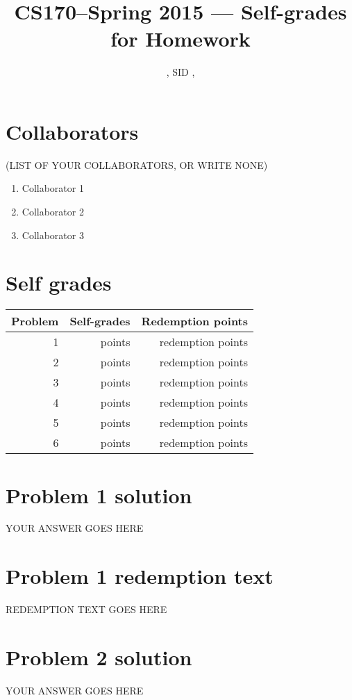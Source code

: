 \documentclass[11pt]{article}
\title{CS170--Spring 2015 --- Self-grades for Homework \Homework}
\author{\Name, SID \SID, \texttt{\Login}}
\date{}
\begin{document}
\maketitle

\section*{Collaborators} 
(LIST OF YOUR COLLABORATORS, OR WRITE NONE)

\begin{enumerate}
\item Collaborator 1
\item Collaborator 2
\item Collaborator 3
\end{enumerate}



\section*{Self grades}

\begin{table}[h]
\centering
\begin{tabular}{|r|r|r|}
\hline
 Problem & Self-grades & Redemption points     \\ \hline
1	&	 points	& 	redemption points     \\ \hline 
2	&	 points	& 	redemption points     \\ \hline 
3	&	 points	& 	redemption points     \\ \hline 
4	&	 points	& 	redemption points     \\ \hline 
5	&	 points	& 	redemption points     \\ \hline 
6	&	 points	& 	redemption points     \\ \hline 
\end{tabular}
\end{table}


\newpage
\section*{Problem 1 solution}
YOUR ANSWER GOES HERE

\newpage
\section*{Problem 1 redemption text}
REDEMPTION TEXT GOES HERE


\newpage
\section*{Problem 2 solution}
YOUR ANSWER GOES HERE
\end{document}
